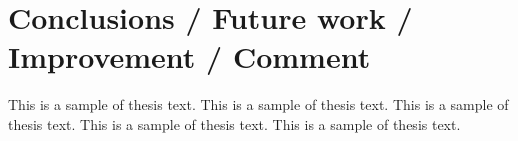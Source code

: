 \chapter{Conclusions / Future work / Improvement / Comment}

This is a sample of thesis text. This is a sample of thesis text. This is a 
sample of thesis text. This is a sample of thesis text. This is a sample of
thesis text.